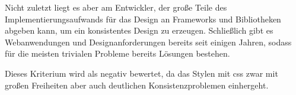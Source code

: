 Nicht zuletzt liegt es aber am Entwickler, der große Teile des Implementierungsaufwands für das Design an Frameworks und Bibliotheken abgeben kann, um ein konsistentes Design zu erzeugen.  Schließlich gibt es Webanwendungen und Designanforderungen bereits seit einigen Jahren, sodass für die meisten trivialen Probleme bereits Lösungen bestehen.

Dieses Kriterium wird als negativ bewertet, da das Stylen mit \ac{css} zwar mit großen Freiheiten aber auch deutlichen Konsistenzproblemen einhergeht.